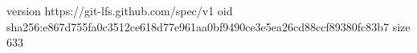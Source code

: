 version https://git-lfs.github.com/spec/v1
oid sha256:e867d755fa0c3512ce618d77e961aa0bf9490ce3e5ea26cd88ccf89380fc83b7
size 633
